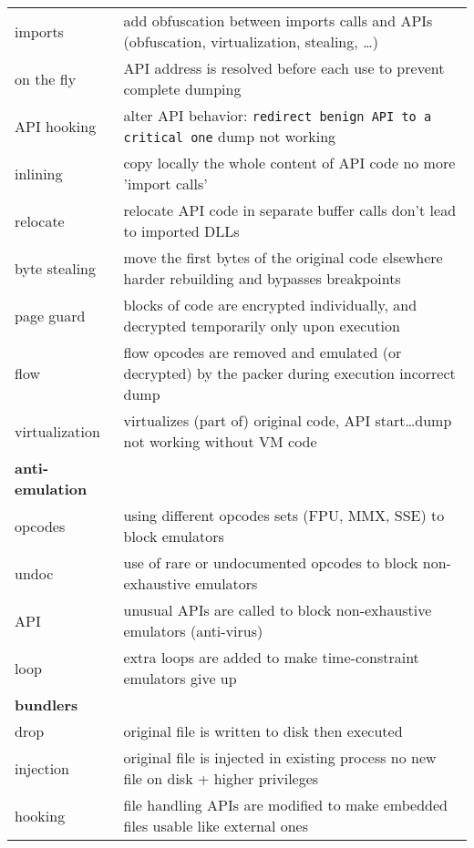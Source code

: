 \begin{tabular}{ll}
imports 		& add obfuscation between imports calls and APIs (obfuscation, virtualization, stealing, \ldots)\\
on the fly		& API address is resolved before each use to prevent complete dumping \\
API hooking		& alter API behavior: {\tt redirect benign API to a critical one} \ra dump not working \\
inlining		& copy locally the whole content of API code \ra no more 'import calls'\\
relocate		& relocate API code in separate buffer \ra calls don't lead to imported DLLs\\
byte stealing	& move the first bytes of the original code elsewhere \ra harder rebuilding and bypasses breakpoints\\
page guard	 	& blocks of code are encrypted individually, and decrypted temporarily only upon execution \\
flow			& flow opcodes are removed and emulated (or decrypted) by the packer during execution \ra incorrect dump\\
virtualization	& virtualizes (part of) original code, API start\ldots \ra dump not working without VM code \rowcolors{0}{white}{lightgray}\\

\midrule
{\bf anti-emulation} & \\
\midrule
opcodes		& using different opcodes sets (FPU, MMX, SSE) to block emulators\\
undoc			& use of rare or undocumented opcodes to block non-exhaustive emulators \\
API			& unusual APIs are called to block non-exhaustive emulators (anti-virus)\\
loop			& extra loops are added to make time-constraint emulators give up \rowcolors{0}{white}{lightgray}\\
\midrule
{\bf bundlers} & \\
\midrule
drop			& original file is written to disk then executed \\
injection		& original file is injected in existing process \ra no new file on disk + higher privileges \\
hooking		& file handling APIs are modified to make embedded files usable like external ones \rowcolors{0}{white}{lightgray}\\

\bottomrule

\end{tabular}


\sig

